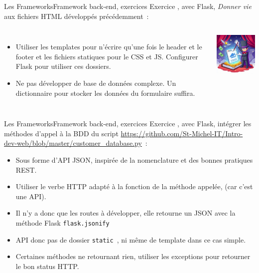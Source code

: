 \documentclass{beamer}
\begin{document}
    \begin{frame}{Les Frameworks}{Framework back-end, exercices}
        Exercice \execcounterdispinc{}, avec Flask, \textit{Donner vie} aux fichiers HTML développés précédemment~:
        \bigbreak
        \begin{columns}
            \begin{itemize}
                \item Utiliser les templates pour n'écrire qu'une fois le header et le footer et les fichiers statiques pour le CSS et JS.
                Configurer Flask pour utiliser ces dossiers.
                \item Ne pas développer de base de données complexe.
                Un dictionnaire pour stocker les données du formulaire suffira.
            \end{itemize}
            \centering
            \includegraphics[width=5cm]{image/html-alive}
        \end{columns}
    \end{frame}

    \begin{frame}{Les Frameworks}{Framework back-end, exercices}
        Exercice \execcounterdispinc{}, avec Flask, intégrer les méthodes d'appel à la BDD du script \url{https://github.com/St-Michel-IT/Intro-dev-web/blob/master/customer_database.py}~:
        \begin{itemize}
            \item Sous forme d'API JSON, inspirée de la nomenclature et des bonnes pratiques REST.
            \item Utiliser le verbe HTTP adapté à la fonction de la méthode appelée, (car c'est une API).
            \item Il n'y a donc que les routes à développer, elle retourne un JSON avec la méthode Flask \lstinline{flask.jsonify}
            \item API donc pas de dossier \lstinline{static}~, ni même de template dans ce cas simple.
            \item Certaines méthodes ne retournant rien, utiliser les exceptions pour retourner le bon status HTTP.
        \end{itemize}
    \end{frame}
\end{document}
